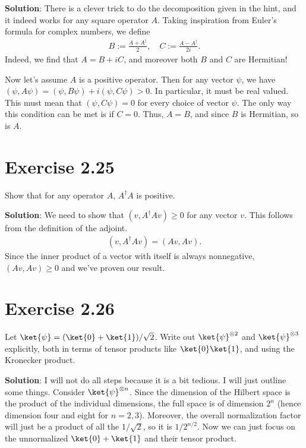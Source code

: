 \documentclass{book}
\begin{document}
    \textbf{Solution}: There is a clever trick to do the decomposition given in the hint, and it indeed works for any square operator $A$. Taking inspiration from Euler's formula for complex numbers, we define
    \begin{align}
        B := \frac{A + A^\dagger}{2}, \quad C := \frac{A - A^\dagger }{2i}.
    \end{align}
    Indeed, we find that $A = B + i C$, and moreover both $B$ and $C$ are Hermitian! 
    
    Now let's assume $A$ is a positive operator. Then for any vector $\psi$, we have $(\psi, A \psi) = (\psi, B\psi) + i (\psi, C\psi) > 0$. In particular, it must be real valued. This must mean that $(\psi, C\psi) = 0$ for every choice of vector $\psi$. The only way this condition can be met is if $C= 0$. Thus, $A = B$, and since $B$ is Hermitian, so is $A$.
    
\section*{Exercise 2.25}
    Show that for any operator $A$, $A^\dagger A$ is positive.
    
    \textbf{Solution}: We need to show that $(v, A^\dagger A v) \geq 0$ for any vector $v$. This follows from the definition of the adjoint.
    \begin{align}
        (v, A^\dagger A v) = (A v, A v).
    \end{align}
    Since the inner product of a vector with itself is always nonnegative, $(A v, A v) \geq 0$ and we've proven our result.
    
\section*{Exercise 2.26}
    Let $\ket{\psi} = (\ket{0}+\ket{1})/\sqrt{2}$. Write out $\ket{\psi}^{\otimes 2}$ and $\ket{\psi}^{\otimes{3}}$ explicitly, both in terms of tensor products like $\ket{0}\ket{1}$, and using the Kronecker product.
    
    \textbf{Solution}: I will not do all steps because it is a bit tedious. I will just outline some things. Consider $\ket{\psi}^{\otimes n}$. Since the dimension of the Hilbert space is the product of the individual dimensions, the full space is of dimension $2^{n}$ (hence dimension four and eight for $n = 2, 3$). Moreover, the overall normalization factor will just be a product of all the $1/\sqrt{2}$, so it is $1/2^{n/2}$. Now we can just focus on the unnormalized $\ket{0} + \ket{1}$ and their tensor product. 
    
\end{document}
